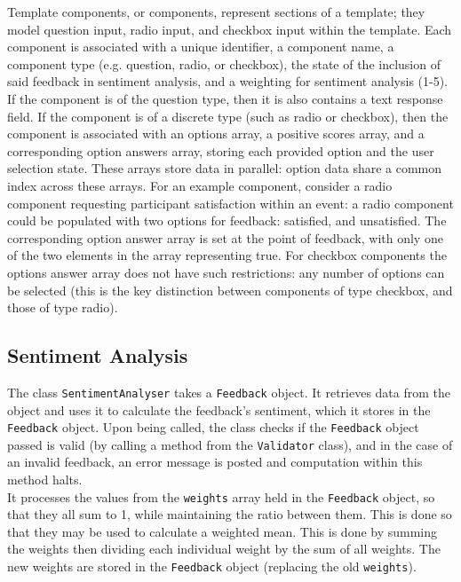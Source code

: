 \documentclass[9pt, titlepage]{extarticle}
\begin{document}
Template components, or components, represent sections of a template; they model question input, radio input, and checkbox input within the template. Each component is associated with a unique identifier, a component name, a component type (e.g. question, radio, or checkbox), the state of the inclusion of said feedback in sentiment analysis, and a weighting for sentiment analysis (1-5). If the component is of the question type, then it is also contains a text response field. If the component is of a discrete type (such as radio or checkbox), then the component is associated with an options array, a positive scores array, and a corresponding option answers array, storing each provided option and the user selection state. These arrays store data in parallel: option data share a common index across these arrays. 
For an example component, consider a radio component requesting participant satisfaction within an event: a radio component could be populated with two options for feedback: satisfied, and unsatisfied. The corresponding option answer array is set at the point of feedback, with only one of the two elements in the array representing true. For checkbox components the options answer array does not have such restrictions: any number of options can be selected (this is the key distinction between components of type checkbox, and those of type radio). 

\subsection{Sentiment Analysis}

The class \texttt{SentimentAnalyser} takes a \texttt{Feedback} object. It retrieves data from the object and uses it to calculate the feedback's sentiment, which it stores in the \texttt{Feedback} object. Upon being called, the class checks if the \texttt{Feedback} object passed is valid (by calling a method from the \texttt{Validator} class), and in the case of an invalid feedback, an error message is posted and computation within this method halts.\\

It processes the values from the \texttt{weights} array held in the \texttt{Feedback} object, so that they all sum to 1, while maintaining the ratio between them. This is done so that they may be used to calculate a weighted mean. This is done by summing the weights then dividing each individual weight by the sum of all weights. The new weights are stored in the \texttt{Feedback} object (replacing the old \texttt{weights}).\\
\end{document}
